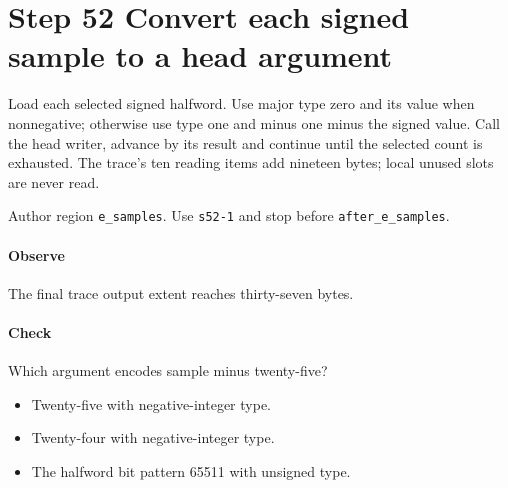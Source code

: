 \section{Step 52 Convert each signed sample to a head argument}\label{cbor-s52}
Load each selected signed halfword. Use major type zero and its value when nonnegative; otherwise use type one and minus one minus the signed value. Call the head writer, advance by its result and continue until the selected count is exhausted. The trace's ten reading items add nineteen bytes; local unused slots are never read.

Author region \texttt{e\_samples}. Use \texttt{s52-1} and stop before \texttt{after\_e\_samples}.

\paragraph{Observe} The final trace output extent reaches thirty-seven bytes.

\paragraph{Check} Which argument encodes sample minus twenty-five?
\begin{itemize}
  \item[A.] Twenty-five with negative-integer type.
  \item[B.] Twenty-four with negative-integer type.
  \item[C.] The halfword bit pattern 65511 with unsigned type.
\end{itemize}
